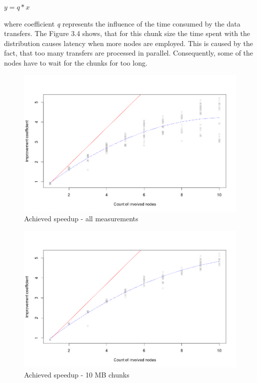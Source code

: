 \begin{center}
$y = q*x$
\end{center}

where coefficient \textit{q} represents the influence of the time
consumed by the data transfers. The Figure 3.4 shows, that for this
chunk size the time spent with the distribution causes latency when more
nodes are employed. This is caused by the fact, that too many transfers
are processed in parallel. Consequently, some of the nodes have to wait
for the chunks for too long.

\begin{figure}[h]
\begin{center}
\includegraphics[scale=0.45]{./img/Rplot_all.png}
\caption{Achieved speedup - all measurements}
\end{center}
\end{figure}

\begin{figure}[h]
\begin{center}
\includegraphics[scale=0.45]{./img/Rplot10k.png}
\caption{Achieved speedup - 10 MB chunks}
\end{center}
\end{figure}

